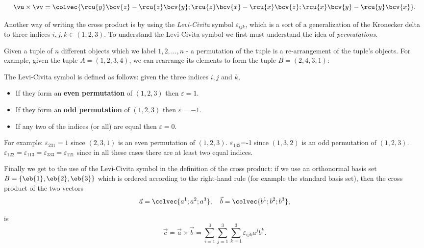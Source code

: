 \begin{equation}
  \vu\times\vv = \colvec{\rcu{y}\bcv{z}-\rcu{z}\bcv{y};\rcu{z}\bcv{x}-\rcu{x}\bcv{z};\rcu{x}\bcv{y}-\rcu{y}\bcv{x}}.
	\label{eq:cross_product_calculation}
\end{equation}

Another way of writing the cross product is by using the \emph{Levi-Civita} symbol $\varepsilon_{ijk}$, which is a sort of a generalization of the Kronecker delta to three indices $i,j,k\in\left(1,2,3\right)$. To understand the Levi-Civita symbol we first must understand the idea of \emph{permutations}.

Given a tuple of $n$ different objects which we label $1,2,\dots,n$ - a permutation of the tuple is a re-arrangement of the tuple's objects. For example, given the tuple $A=\left(1,2,3,4\right)$, we can rearrange its elements to form the tuple $B=\left(2,4,3,1\right)$:


The Levi-Civita symbol is defined as follows: given the three indices $i,j$ and $k$,
\begin{itemize}
  \item If they form an \textbf{even permutation} of $\left(1,2,3\right)$ then $\varepsilon=1$.
  \item If they form an \textbf{odd permutation} of $\left(1,2,3\right)$ then $\varepsilon=-1$.
  \item If any two of the indices (or all) are equal then $\varepsilon=0$.
\end{itemize}

For example: $\varepsilon_{231}=1$ since $\left(2,3,1\right)$ is an even permutation of $\left(1,2,3\right)$. $\varepsilon_{132}$=-1 since $(1,3,2)$ is an odd permutation of $(1,2,3)$. $\varepsilon_{122}=\varepsilon_{113}=\varepsilon_{333}=\varepsilon_{121}$ since in all these cases there are at least two equal indices.

Finally we get to the use of the Levi-Civita symbol in the definition of the cross product: if we use an orthonormal basis set $B=\left\{\eb{1},\eb{2},\eb{3}\right\}$ which is ordered according to the right-hand rule (for example the standard basis set), then the cross product of the two vectors
\[
  \vec{a}=\colvec{a^{1};a^{2};a^{3}},\quad\vec{b}=\colvec{b^{1};b^{2};b^{3}},
\]

is
\begin{equation}
  \vec{c} = \vec{a}\times\vec{b} = \sum\limits_{i=1}^{3}\sum\limits_{j=1}^{3}\sum\limits_{k=1}^{3}\varepsilon_{ijk}a^{j}b^{k}.
  \label{eq:cross_product_LCsymbol}
\end{equation}

